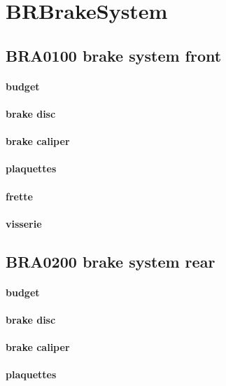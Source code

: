 \newpage 
 \section*{BR\textunderscore BrakeSystem} 
 \par 
	\subsection*{BR\textunderscore A0100 brake system front} 
 \par 
		\paragraph{budget} 
		\paragraph{brake disc} 
		\paragraph{brake caliper} 
		\paragraph{plaquettes} 
		\paragraph{frette} 
		\paragraph{visserie} 
	\subsection*{BR\textunderscore A0200 brake system rear} 
 \par 
		\paragraph{budget} 
		\paragraph{brake disc} 
		\paragraph{brake caliper} 
		\paragraph{plaquettes} 

